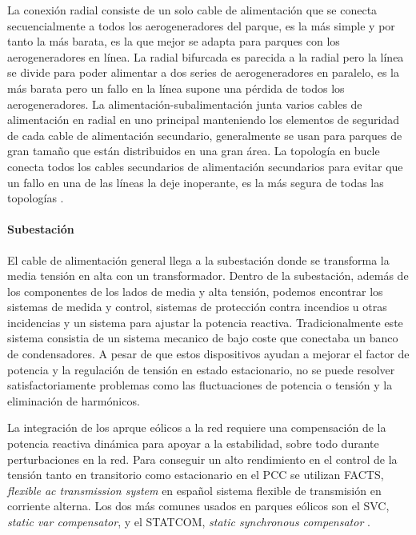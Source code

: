 \documentclass{book}
\begin{document}
La conexi\'on radial consiste de un solo cable de alimentaci\'on que se conecta secuencialmente a todos los aerogeneradores del parque, es la m\'as simple y por tanto la m\'as barata, es la que mejor se adapta para parques con los aerogeneradores en l\'inea. La radial bifurcada es parecida a la radial pero la l\'inea se divide para poder alimentar a dos series de aerogeneradores en paralelo, es la m\'as barata pero un fallo en la l\'inea supone una p\'erdida de todos los aerogeneradores. La alimentaci\'on-subalimentaci\'on junta varios cables de alimentaci\'on en radial en uno principal manteniendo los elementos de seguridad de cada cable de alimentaci\'on secundario, generalmente se usan para parques de gran tamaño que est\'an distribuidos en una gran \'area. La topolog\'ia en bucle conecta todos los cables secundarios de alimentaci\'on secundarios para evitar que un fallo en una de las l\'ineas la deje inoperante, es la m\'as segura de todas las topolog\'ias \cite{ComunicationTopologies}.\par
		\paragraph {Subestaci\'on}
El cable de alimentaci\'on general llega a la subestaci\'on donde se transforma la media tensi\'on en alta con un transformador. Dentro de la subestaci\'on, adem\'as de los componentes de los lados de media y alta tensi\'on, podemos encontrar los sistemas de medida y control, sistemas de protecci\'on contra incendios u otras incidencias y un sistema para ajustar la potencia reactiva. Tradicionalmente este sistema consistia de un sistema mecanico de bajo coste que conectaba un banco de condensadores. A pesar de que estos dispositivos ayudan a mejorar el factor de potencia y la regulaci\'on de tensi\'on en estado estacionario, no se puede resolver satisfactoriamente problemas como las fluctuaciones de potencia o tensi\'on y la eliminaci\'on de harm\'onicos. \par

La integraci\'on de los aprque e\'olicos a la red requiere una compensaci\'on de la potencia reactiva din\'amica para apoyar a la estabilidad, sobre todo durante perturbaciones en la red. Para conseguir un alto rendimiento en el control de la tensi\'on tanto en transitorio como estacionario en el PCC se utilizan FACTS, \emph{flexible ac transmission system} en español sistema flexible de transmisi\'on en corriente alterna. Los dos m\'as comunes usados en parques e\'olicos son el SVC, \emph{static var compensator}, y el STATCOM, \emph{static synchronous compensator} \cite{FACTS}.  \par
\end{document}
